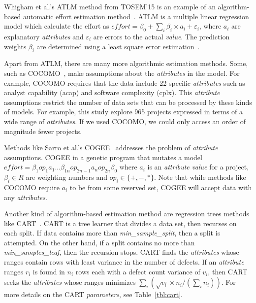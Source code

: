 \documentclass[10pt,conference]{IEEEtran}
\begin{document}
 Whigham et al.'s ATLM method from TOSEM'15 is an example of an algorithm-based automatic effort estimation method~\cite{Whigham:2015}. ATLM is a multiple linear regression model which calculate the effort as $\mathit{effort} = \beta_0 + \sum_i\beta_i\times a_{i} +  \varepsilon_i$,  where $a_i$ are explanatory {\em attributes} and $\varepsilon_i$ are errors to the actual {\em value}. The prediction weights $\beta_i$ are determined using a least square error estimation~\cite{neter1996applied}.


Apart from ATLM, there are many more algorithmic estimation methods. Some, such as COCOMO~\cite{boehm1981software}, make assumptions
about the {\em attributes} in the model. For example, COCOMO requires that the
data include 22 specific {\em attributes} such as analyst capability (acap) and software complexity (cplx).  This {\em attribute} assumptions restrict the number
of data sets that can be processed by these kinds of models. For example,
this study explore 965 projects expressed in terms of a wide range of {\em attributes}.  If we used COCOMO, we could only access an order of magnitude   fewer projects.

Methods like Sarro et al.'s COGEE~\cite{sarro2016multi} addresses
the problem of {\em attribute} assumptions. COGEE in a genetic program
that mutates a model $\mathit{effort} = \beta_1 \mathit{op}_1 a_1  ... \beta_{1n} \mathit{op}_{2n-1} a_n  \mathit{op}_{2n} \beta_0$ 
where $a_i$ is an {\em attribute} {\em value} for a project,  $\beta_i \in R$ are weighting numbers and
\mbox{$\mathit{op_i}\in \{+,-,*\}$}. Note that while methods like COCOMO require $a_i$ to be from some reserved set, 
COGEE will accept data with any {\em attributes}.




Another kind of algorithm-based estimation method are regression trees methods like CART~\cite{brieman84}.  
CART is a  tree learner that divides a data set, then recurses
on each split.
If data contains more than {\em min\_sample\_split}, then a split is attempted.
On the other hand, if a split contains no more than {\em min\_samples\_leaf}, then the recursion stops. 
CART finds the {\em attributes} whose ranges contain rows with least variance in the number
of defects. If an {\em attribute} ranges $r_i$ is found in 
$n_i$ rows each with a  defect count variance of $v_i$, then CART seeks the {\em attributes}
whose ranges minimizes $\sum_i \left(\sqrt{v_i}\times n_i/(\sum_i n_i)\right)$.
For more details on the CART {\em parameters}, see Table~\ref{tbl:cart}.
\end{document}
